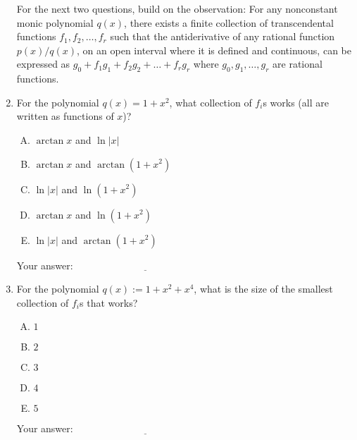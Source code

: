 \documentclass[10pt]{amsart}
\begin{document}
\begin{enumerate}
  For the next two questions, build on the observation: For any
  nonconstant monic polynomial $q(x)$, there exists a finite
  collection of transcendental functions $f_1, f_2, \dots, f_r$ such
  that the antiderivative of any rational function $p(x)/q(x)$, on an
  open interval where it is defined and continuous, can be expressed
  as $g_0 + f_1g_1 + f_2g_2 + \dots + f_rg_r$ where $g_0, g_1, \dots,
  g_r$ are rational functions.

\item For the polynomial $q(x) = 1 + x^2$, what collection of $f_i$s
  works (all are written as functions of $x$)?

  \begin{enumerate}[(A)]
  \item $\arctan x$ and $\ln|x|$
  \item $\arctan x$ and $\arctan(1 + x^2)$
  \item $\ln|x|$ and $\ln(1 + x^2)$ 
  \item $\arctan x$ and $\ln(1 + x^2)$
  \item $\ln|x|$ and $\arctan(1 + x^2)$
  \end{enumerate}

  \vspace{0.05in}
  Your answer: $\underline{\qquad\qquad\qquad\qquad\qquad\qquad\qquad}$
  \vspace{0.05in}

\item For the polynomial $q(x) := 1 + x^2 + x^4$, what is the
  size of the smallest collection of $f_i$s that works?

  \begin{enumerate}[(A)]
  \item $1$
  \item $2$
  \item $3$
  \item $4$
  \item $5$
  \end{enumerate}

  \vspace{0.05in}
  Your answer: $\underline{\qquad\qquad\qquad\qquad\qquad\qquad\qquad}$
  \vspace{0.05in}

\end{enumerate}
\end{document}
